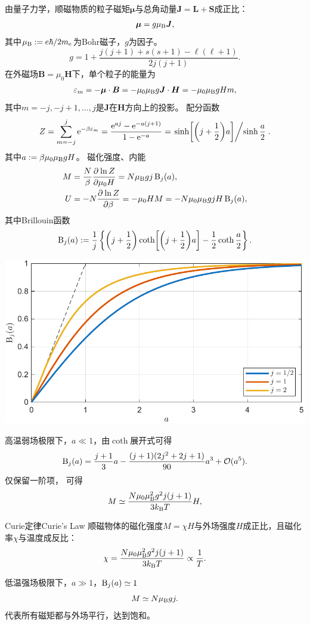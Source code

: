 由量子力学，顺磁物质的粒子磁矩$\bm\mu$与总角动量$\bm J=\bm L+\bm S$成正比：
\[
	\bm\mu=g\mu_\mathrm B\bm J,
\]
其中$\mu_\mathrm B:=e\hbar/2m_\mathrm e$为Bohr磁子，$g$为\Lande 因子。
\[
	g=1+\frac{j(j+1)+s(s+1)-\ell(\ell+1)}{2j(j+1)}.
\]
在外磁场$\bm B=\mu_0\bm H$下，单个粒子的能量为
\[
	\varepsilon_m=-\bm\mu\cdot\bm B=-\mu_0\mu_\mathrm B g\bm J\cdot\bm H=-\mu_0\mu_\mathrm B gHm,
\]
其中$m=-j,-j+1,\ldots,j$是$\bm J$在$\bm H$方向上的投影。
配分函数
\begin{equation}
	Z=\sum_{m=-j}^j\mathop{}\!\mathrm{e}^{-\beta\varepsilon_m}=\frac{\mathop{}\!\mathrm{e}^{aj}-\mathop{}\!\mathrm{e}^{-a(j+1)}}{1-\mathop{}\!\mathrm{e}^{-a}}=\left.{\sinh\biggl[\biggl(j+\frac12\biggr)a\biggr]}\middle/{\sinh\frac a2}\right..
\end{equation}
其中$a:=\beta\mu_0\mu_\mathrm B gH$。
磁化强度、内能
\begin{subequations}
	\begin{align}
		M&=\frac N\beta\frac{\partial^{{}}\ln Z}{\partial{\mu_0H}^{{}}}=N\mu_\mathrm B gj\operatorname{B}_j(a),\\
		U&=-N\frac{\partial^{{}}\ln Z}{\partial{\beta}^{{}}}=-\mu_0HM=-N\mu_0\mu_\mathrm B gjH\operatorname{B}_j(a),
	\end{align}
\end{subequations}
其中Brillouin函数
\[
	\operatorname{B}_j(a):=\frac1j\left\{\biggl(j+\frac12\biggr)\coth\biggl[\biggl(j+\frac12\biggr)a\biggr]-\frac12\coth\frac a2\right\}.
\]
\begin{center}
	\includegraphics[width=0.8\linewidth]{figures/Brillouin.pdf}
	\label{fig:Brillouin function}
\end{center}

高温弱场极限下，$a\ll 1$，由$\coth$展开式可得
\[
	\operatorname{B}_j(a)=\frac{j+1}3a-\frac{(j+1)(2j^2+2j+1)}{90}a^3+\mathcal O(a^5).
\]
仅保留一阶项，
可得
\[
	M\simeq\frac{N\mu_0\mu_\mathrm B^2g^2j(j+1)}{3k_{\mathrm B} T}H,
\]
\begin{theorem}
	{Curie定律}{Curie's Law}
	顺磁物体的磁化强度$M=\chi H$与外场强度$H$成正比，且磁化率$\chi$与温度成反比：
	\begin{equation}
		\chi=\frac{N\mu_0\mu_\mathrm B^2g^2j(j+1)}{3k_{\mathrm B} T}\propto\frac1T.
	\end{equation}
\end{theorem}
低温强场极限下，$a\gg 1$，$\operatorname{B}_j(a)\simeq 1$
\[
	M\simeq N\mu_\mathrm B gj.
\]
代表所有磁矩都与外场平行，达到饱和。

